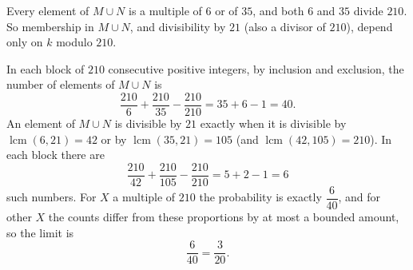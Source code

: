 Every element of $M\cup N$ is a multiple of $6$ or of $35$, and both $6$ and $35$ divide $210$. So membership in $M\cup N$, and divisibility by $21$ (also a divisor of $210$), depend only on $k$ modulo $210$.

In each block of $210$ consecutive positive integers, by inclusion and exclusion, the number of elements of $M\cup N$ is
\[
\dfrac{210}{6}+\dfrac{210}{35}-\dfrac{210}{210}=35+6-1=40 .
\]
An element of $M\cup N$ is divisible by $21$ exactly when it is divisible by $\operatorname{lcm}(6,21)=42$ or by $\operatorname{lcm}(35,21)=105$ (and $\operatorname{lcm}(42,105)=210$). In each block there are
\[
\dfrac{210}{42}+\dfrac{210}{105}-\dfrac{210}{210}=5+2-1=6
\]
such numbers. For $X$ a multiple of $210$ the probability is exactly $\dfrac{6}{40}$, and for other $X$ the counts differ from these proportions by at most a bounded amount, so the limit is
\[
\dfrac{6}{40}=\boxed{\dfrac{3}{20}}.
\]
